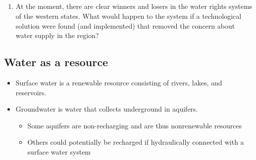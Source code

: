 \documentclass[]{article}
\providecommand{\tightlist}{%
  \setlength{\itemsep}{0pt}\setlength{\parskip}{0pt}}
\begin{document}
\hypertarget{section-6}{%
\subsection{}\label{section-6}}

\begin{enumerate}
\def\labelenumi{\arabic{enumi}.}
\setcounter{enumi}{2}
\tightlist
\item
  At the moment, there are clear winners and losers in the water rights
  systems of the western states. What would happen to the system if a
  technological solution were found (and implemented) that removed the
  concern about water supply in the region?
\end{enumerate}

\hypertarget{water-as-a-resource}{%
\subsection{Water as a resource}\label{water-as-a-resource}}

\begin{itemize}
\tightlist
\item
  Surface water is a renewable resource consisting of rivers, lakes, and
  reservoirs.
\item
  Groundwater is water that collects underground in aquifers.

  \begin{itemize}
  \tightlist
  \item
    Some aquifers are non-recharging and are thus nonrenewable resources
  \item
    Others could potentially be recharged if hydraulically connected
    with a surface water system
  \end{itemize}
\end{itemize}

\hypertarget{section-7}{%
\subsection{}\label{section-7}}
\end{document}
